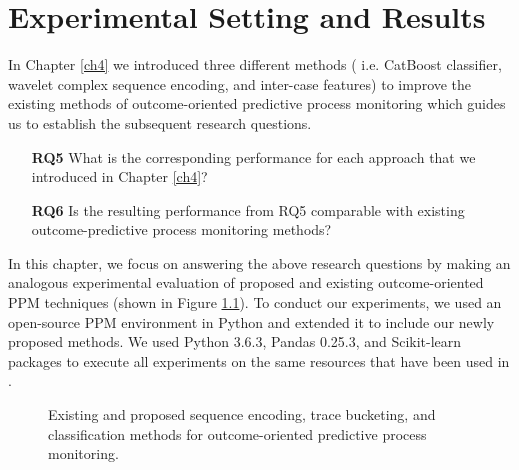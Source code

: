 
\chapter{Experimental Setting and Results} \label{ch5}%
In Chapter \ref{ch4} we introduced three different methods ( i.e. CatBoost classifier, wavelet complex sequence encoding, and inter-case features) to improve the existing methods of outcome-oriented predictive process monitoring which guides us to establish the subsequent research questions. 

	\begin{itemize}[itemindent=0em]
	\item[\textbf{RQ5}] What is the corresponding performance for each approach that we introduced in Chapter \ref{ch4}?
	\item[\textbf{RQ6}]  Is the resulting performance from RQ5 comparable with existing outcome-predictive process monitoring methods?	
\end{itemize}

In this chapter, we focus on answering the above research questions by making an analogous experimental evaluation of proposed and existing outcome-oriented PPM techniques (shown in Figure \ref{fig:all2}). To conduct our experiments, we used an open-source PPM environment in Python \cite{teinemaa2019outcome} and extended it to include our newly proposed methods. We used Python 3.6.3, Pandas 0.25.3, and Scikit-learn packages \cite{pedregosa2011scikit} to execute all experiments on the same resources that have been used in \cite{teinemaa2019outcome}.


\begin{figure}[htb]
	\begin{center}
		\caption[Predictive process monitoring methods]{Existing and proposed sequence encoding, trace bucketing, and classification methods for outcome-oriented predictive process monitoring.}
		\label{fig:all2}
	\end{center}
\end{figure}

